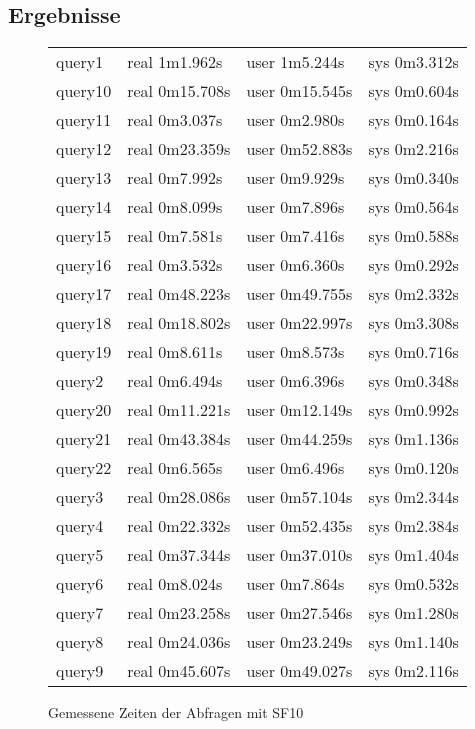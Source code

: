 \subsection{Ergebnisse}
\begin{figure}[htb]
\centering
\begin{tabular}{p{}|p{}|p{}|p{}}
query1 & real 1m1.962s & user 1m5.244s & sys 0m3.312s\\
query10 & real 0m15.708s & user 0m15.545s & sys 0m0.604s\\
query11 & real 0m3.037s & user 0m2.980s & sys 0m0.164s\\
query12 & real 0m23.359s & user 0m52.883s & sys 0m2.216s\\
query13 & real 0m7.992s & user 0m9.929s & sys 0m0.340s\\
query14 & real 0m8.099s & user 0m7.896s & sys 0m0.564s\\
query15 & real 0m7.581s & user 0m7.416s & sys 0m0.588s\\
query16 & real 0m3.532s & user 0m6.360s & sys 0m0.292s\\
query17 & real 0m48.223s & user 0m49.755s & sys 0m2.332s\\
query18 & real 0m18.802s & user 0m22.997s & sys 0m3.308s\\
query19 & real 0m8.611s & user 0m8.573s & sys 0m0.716s\\
query2 & real 0m6.494s & user 0m6.396s & sys 0m0.348s\\
query20 & real 0m11.221s & user 0m12.149s & sys 0m0.992s\\
query21 & real 0m43.384s & user 0m44.259s & sys 0m1.136s\\
query22 & real 0m6.565s & user 0m6.496s & sys 0m0.120s\\
query3 & real 0m28.086s & user 0m57.104s & sys 0m2.344s\\
query4 & real 0m22.332s & user 0m52.435s & sys 0m2.384s\\
query5 & real 0m37.344s & user 0m37.010s & sys 0m1.404s\\
query6 & real 0m8.024s & user 0m7.864s & sys 0m0.532s\\
query7 & real 0m23.258s & user 0m27.546s & sys 0m1.280s\\
query8 & real 0m24.036s & user 0m23.249s & sys 0m1.140s\\
query9 & real 0m45.607s & user 0m49.027s & sys 0m2.116s\\
\end{tabular}
\caption{Gemessene Zeiten der Abfragen mit SF10}
\end{figure}

